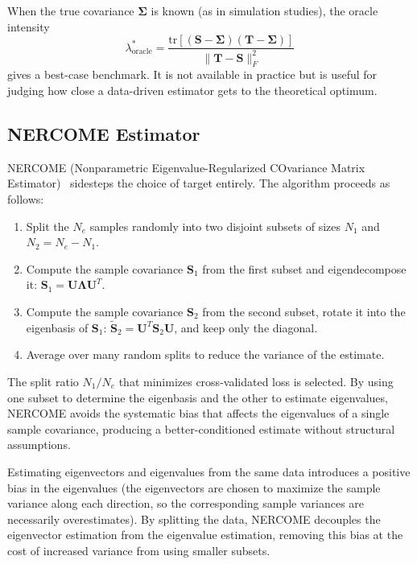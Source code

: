 When the true covariance $\boldsymbol{\Sigma}$ is known (as in simulation studies), the oracle intensity
\begin{equation}
\label{eq:oracle}
\lambda^*_{\text{oracle}} = \frac{\text{tr}[(\mathbf{S} - \boldsymbol{\Sigma})(\mathbf{T} - \boldsymbol{\Sigma})]}{\|\mathbf{T} - \mathbf{S}\|_F^2}
\end{equation}
gives a best-case benchmark. It is not available in practice but is useful for judging how close a data-driven estimator gets to the theoretical optimum.

\subsection{NERCOME Estimator}
\label{sec:nercome}

NERCOME (Nonparametric Eigenvalue-Regularized COvariance Matrix Estimator)~\citep{lam2016nonparametric} sidesteps the choice of target entirely. The algorithm proceeds as follows:
\begin{enumerate}
\item Split the $N_e$ samples randomly into two disjoint subsets of sizes $N_1$ and $N_2 = N_e - N_1$.
\item Compute the sample covariance $\mathbf{S}_1$ from the first subset and eigendecompose it: $\mathbf{S}_1 = \mathbf{U} \boldsymbol{\Lambda} \mathbf{U}^T$.
\item Compute the sample covariance $\mathbf{S}_2$ from the second subset, rotate it into the eigenbasis of $\mathbf{S}_1$: $\tilde{\mathbf{S}}_2 = \mathbf{U}^T \mathbf{S}_2 \mathbf{U}$, and keep only the diagonal.
\item Average over many random splits to reduce the variance of the estimate.
\end{enumerate}
The split ratio $N_1 / N_e$ that minimizes cross-validated loss is selected. By using one subset to determine the eigenbasis and the other to estimate eigenvalues, NERCOME avoids the systematic bias that affects the eigenvalues of a single sample covariance, producing a better-conditioned estimate without structural assumptions.

Estimating eigenvectors and eigenvalues from the same data introduces a positive bias in the eigenvalues (the eigenvectors are chosen to maximize the sample variance along each direction, so the corresponding sample variances are necessarily overestimates). By splitting the data, NERCOME decouples the eigenvector estimation from the eigenvalue estimation, removing this bias at the cost of increased variance from using smaller subsets.

